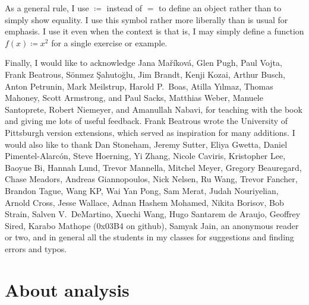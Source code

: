 As a general rule, I use $\coloneqq$ instead of $=$ to define an
object rather than to simply show equality.  I use this symbol rather more
liberally than is usual for emphasis.
I use it even when the context is 
that is, I may simply define a function $f(x) \coloneqq x^2$
for a single exercise or example.

\medskip

Finally, I would like to acknowledge Jana Ma\v{r}\'ikov\'a,
Glen Pugh, Paul Vojta, Frank Beatrous, S\"{o}nmez \c{S}ahuto\u{g}lu,
Jim Brandt, Kenji Kozai, Arthur Busch,  Anton Petrunin,
Mark Meilstrup, Harold P.\ Boas, Atilla Y{\i}lmaz,
Thomas Mahoney, Scott Armstrong, and Paul Sacks,
Matthias Weber, Manuele Santoprete,
Robert Niemeyer,
and
Amanullah Nabavi,
for teaching with the book and giving me lots of useful feedback.
Frank Beatrous wrote the University of Pittsburgh version extensions, which
served as inspiration for many additions.
I would also like to thank
Dan Stoneham, Jeremy Sutter, Eliya Gwetta, Daniel Pimentel-Alarc\'on,
Steve Hoerning, Yi Zhang, Nicole Caviris,
Kristopher Lee, Baoyue Bi, Hannah Lund,
Trevor Mannella, Mitchel Meyer, Gregory Beauregard,
Chase Meadors, Andreas Giannopoulos, Nick Nelsen,
Ru Wang, Trevor Fancher, Brandon Tague, Wang KP\@,
Wai Yan Pong, Sam Merat, Judah Nouriyelian,
Arnold Cross, Jesse Wallace,
Adnan Hashem Mohamed,
Nikita Borisov, Bob Strain,
Salven V.\ DeMartino,
Xuechi Wang,
Hugo Santarem de Araujo,
Geoffrey Sired,
Karabo Mathope (0x03B4 on github),
Samyak Jain,
an anonymous reader or two, and in general all the students in my classes
for suggestions and finding errors and typos.

\VolTwoIntro


\sectionnewpage
\section{About analysis} \label{sec:aboutra}

